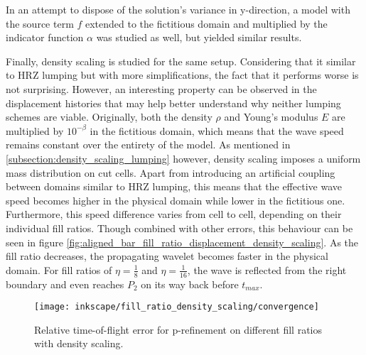 In an attempt to dispose of the solution's variance in y-direction, a model with the source term $f$ extended to the fictitious domain and multiplied by the indicator function $\alpha$ was studied as well, but yielded similar results.

Finally, density scaling is studied for the same setup. Considering that it similar to HRZ lumping but with more simplifications, the fact that it performs worse is not surprising. However, an interesting property can be observed in the displacement histories that may help better understand why neither lumping schemes are viable. Originally, both the density $\rho$ and Young's modulus $E$ are multiplied by $10^{-\beta}$ in the fictitious domain, which means that the wave speed remains constant over the entirety of the model. As mentioned in \ref{subsection:density_scaling_lumping} however, density scaling imposes a uniform mass distribution on cut cells. Apart from introducing an artificial coupling between domains similar to HRZ lumping, this means that the effective wave speed becomes higher in the physical domain while lower in the fictitious one. Furthermore, this speed difference varies from cell to cell, depending on their individual fill ratios. Though combined with other errors, this behaviour can be seen in figure \ref{fig:aligned_bar_fill_ratio_displacement_density_scaling}. As the fill ratio decreases, the propagating wavelet becomes faster in the physical domain. For fill ratios of $\eta=\frac{1}{8}$ and $\eta=\frac{1}{16}$, the wave is reflected from the right boundary and even reaches $P_2$ on its way back before $t_{max}$.

\begin{figure}[!h]
	\centering
	\texttt{[image: inkscape/fill\_ratio\_density\_scaling/convergence]}
	\caption{Relative time-of-flight error for p-refinement on different fill ratios with density scaling.}
	\label{fig:aligned_bar_fill_ratio_convergence_density_scaling}
\end{figure}

